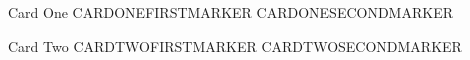 \documentclass{pnpcards}
\begin{document}
\begin{card}{Card One}
CARDONEFIRSTMARKER
CARDONESECONDMARKER
\end{card}

\begin{card}{Card Two}
CARDTWOFIRSTMARKER
CARDTWOSECONDMARKER
\end{card}
\end{document}
